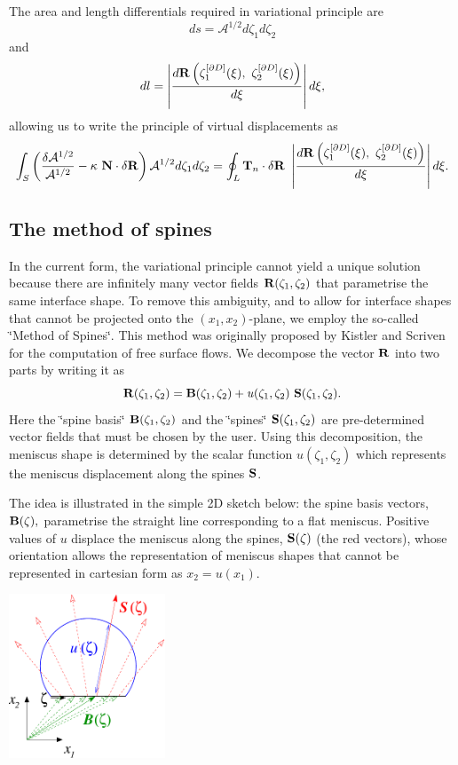 The area and length differentials required in variational principle are \[ d s=\mathcal{A}^{1/2} d \zeta_1 d \zeta_2 \] and \[ d l=\left| \frac{d {\bf R}\left( \zeta_1^{[\partial D]}(\xi), \ \zeta_2^{[\partial D]}(\xi) \right)}{d \xi} \right| d \xi, \] allowing us to write the principle of virtual displacements as \[ \int_S \left( \frac{\delta \mathcal{A}^{1/2}}{\mathcal{A}^{1/2}} - \kappa \ {\bf N} \cdot \delta {\bf R} \right) \mathcal{A}^{1/2} d \zeta_1 d \zeta_2 = \oint_{L} {\bf T}_n \cdot \delta {\bf R} \ \left| \frac{d {\bf R}\left( \zeta_1^{[\partial D]}(\xi), \ \zeta_2^{[\partial D]}(\xi) \right)}{d \xi} \right| d \xi. \]\hypertarget{index_spines}{}\subsection{The method of spines}\label{index_spines}
In the current form, the variational principle cannot yield a unique solution because there are infinitely many vector fields $ {\bf R}(\zeta_1,\zeta_2) $ that parametrise the same interface shape. To remove this ambiguity, and to allow for interface shapes that cannot be projected onto the $ (x_1,x_2) $-\/plane, we employ the so-\/called \char`\"{}\+Method of Spines\char`\"{}. This method was originally proposed by Kistler and Scriven for the computation of free surface flows. We decompose the vector $ {\bf R} $ into two parts by writing it as \[ {\bf R}(\zeta_1,\zeta_2) = {\bf B}(\zeta_1,\zeta_2) + \mathit{u}(\zeta_1,\zeta_2) \ {\bf S}(\zeta_1,\zeta_2). \] Here the \char`\"{}spine basis\char`\"{} ${\bf B}(\zeta_1,\zeta_2)$ and the \char`\"{}spines\char`\"{} ${\bf S}(\zeta_1,\zeta_2)$ are pre-\/determined vector fields that must be chosen by the user. Using this decomposition, the meniscus shape is determined by the scalar function $\mathit{u}(\zeta_1,\zeta_2)$ which represents the meniscus\textquotesingle{} displacement along the spines ${\bf S}$.

The idea is illustrated in the simple 2D sketch below\+: the spine basis vectors, $ {\bf B}(\zeta), $ parametrise the straight line corresponding to a flat meniscus. Positive values of $ u $ displace the meniscus along the spines, $ {\bf S}(\zeta) $ (the red vectors), whose orientation allows the representation of meniscus shapes that cannot be represented in cartesian form as $ x_2 = u(x_1). $

 
\begin{DoxyImage}
\includegraphics[width=0.35\textwidth]{spine_sketch}
\end{DoxyImage}


